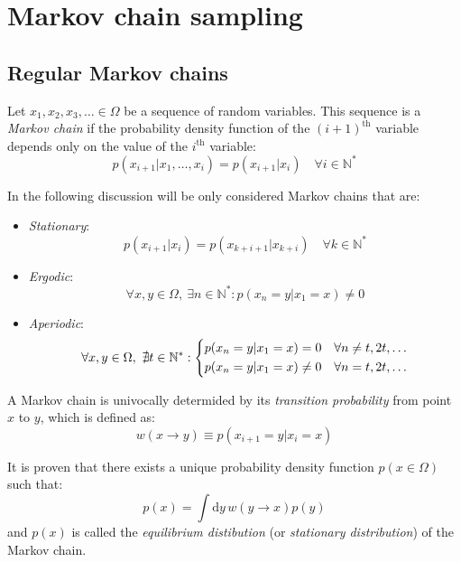 \section{Markov chain sampling}

\subsection*{Regular Markov chains}
Let $x_1, x_2, x_3, \ldots \in \Omega$ be a sequence of random variables.
This sequence is a \emph{Markov chain} if the probability density function of the $(i+1)^\mathrm{th}$
variable depends only on the value of the $i^\mathrm{th}$ variable:
\[
    p(x_{i+1}|x_1, \ldots, x_i) = p(x_{i+1}|x_i) \quad \forall i\in\mathbb N^*
\]

In the following discussion will be only considered Markov chains that are:
\begin{itemize}
    \item \emph{Stationary}:
        \[
            p(x_{i+1}|x_i) = p(x_{k+i+1}|x_{k+i}) \quad \forall k\in\mathbb N^*
        \]
    \item \emph{Ergodic}:
        \[
            \forall x,y \in \Omega,\ \exists n\in\mathbb N^* : p(x_n=y|x_1=x) \neq 0
        \]
    \item \emph{Aperiodic}:
        \[
            \forall x,y \in \Omega,\ \nexists t\in\mathbb N^* :
            \begin{dcases}
                p(x_n=y|x_1=x)=0 \quad \forall n\neq t,2t,\ldots \\
                p(x_n=y|x_1=x)\neq0 \quad \forall n=t,2t,\ldots
            \end{dcases}
        \]
\end{itemize}

A Markov chain is univocally determided by its \emph{transition probability} from point $x$ to $y$, which is defined as:
\begin{equation}\label{eq:transition}
    w(x \to y) \equiv p(x_{i+1}=y|x_i=x)
\end{equation}

It is proven \cite{mc-mt} that there exists a unique probability density function $p(x\in\Omega)$
such that:
\begin{equation}\label{eq:equilibrium}
	p(x) = \int\mathrm dy\,w(y \to x)p(y)
\end{equation}
and $p(x)$ is called the \emph{equilibrium distibution} (or \emph{stationary distribution}) of the Markov chain.

